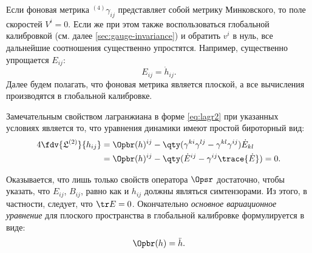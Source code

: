 \documentclass[\docroot/reports/draft/report.tex]{subfiles}
\begin{document}
    Если фоновая метрика ${}^{(4)}\gamma_{ij}$ представляет собой метрику Минковского, то поле скоростей $V^i = 0$. Если же при этом также воспользоваться глобальной калибровкой (см. далее \autoref{sec:gauge-invariance}) и обратить $v^i$ в нуль, все дальнейшие соотношения существенно упростятся. Например, существенно упрощается $E_{ij}$:
    \begin{equation*}
        E_{ij} = \dot{h}_{ij} .
    \end{equation*}
    Далее будем полагать, что фоновая метрика является плоской, а все вычисления производятся в глобальной калибровке.

    Замечательным свойством лагранжиана в форме \autoref{eq:lagr2} при указанных условиях является то, что уравнения динамики имеют простой бироторный вид:
    \begin{equation}\begin{aligned}\label{eq:lagr2var}
        4\fdv{\mathfrak{L}^{(2)}}{h_{ij}} &= \Opbr(h)^{ij} -
        \qty(\gamma^{ki}\gamma^{lj} - \gamma^{kl}\gamma^{ij}) \dot{E}_{kl} \\
                   &= \Opbr(h)^{ij} - \qty(\dot{E}^{ij} - \gamma^{ij} \trace{\dot{E}}) = 0.
    \end{aligned}\end{equation}

    Оказывается, что лишь только свойств оператора $\Opsr$ достаточно, чтобы указать, что $E_{ij}$, $B_{ij}$, равно как и $h_{ij}$ должны являться симтензорами. Из этого, в частности, следует, что $\tr E = 0$. Окончательно \textit{основное вариационное уравнение} для плоского пространства в глобальной калибровке формулируется в виде:
    \begin{equation}\label{eq:lagr2var-br}
        \Opbr(h) = \ddot{h} .
    \end{equation}
\end{document}
